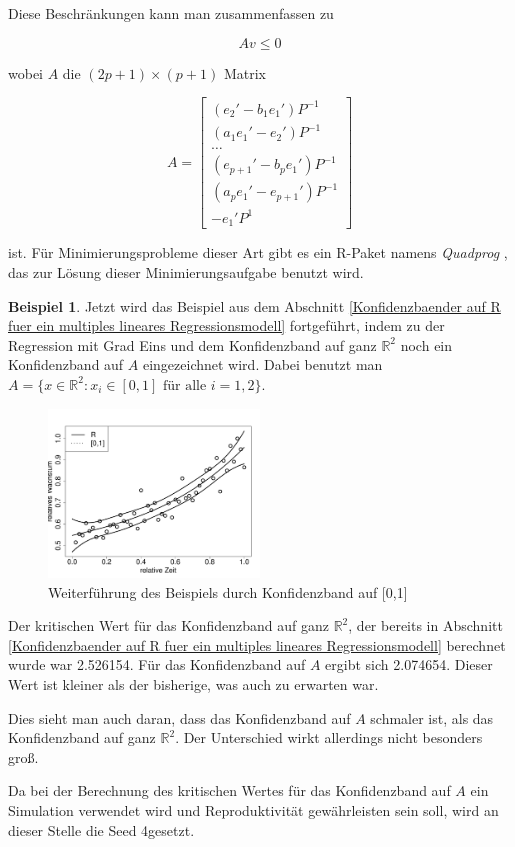 \documentclass[12pt,a4paper]{article}
\theoremstyle{definition}
\newtheorem{Beispiel}[Definition]{Beispiel}
\theoremstyle{definition}
\theoremstyle{definition}
\theoremstyle{definition}
\newcommand{\cR}{2.526154}
\newcommand{\seedsimulation}{4}
\newcommand{\cA}{2.074654}
\begin{document}
Diese Beschränkungen kann man zusammenfassen zu 

\begin{equation*}
A v \leq 0
\end{equation*}

wobei $A$ die $(2p+1) \times (p+1)$ Matrix

\[ 
A = 
\begin{bmatrix} (e_2'-b_1 e_1')P^{-1}  \\ 
				(a_1 e_1' - e_2')P^{-1}  \\  
				\ldots						 \\ 
				(e_{p+1}' - b_p e_1') P^{-1}	\\  
				(a_p e_1' - e_{p+1}')P^{-1}  \\
				-e_1'P^{1} 
\end{bmatrix}
\]

ist. Für Minimierungsprobleme dieser Art gibt es ein R-Paket namens \textit{Quadprog} , das zur Lösung dieser Minimierungsaufgabe benutzt wird.

\begin{Beispiel}
Jetzt wird das Beispiel aus dem Abschnitt \ref{Konfidenzbaender auf R fuer ein multiples lineares Regressionsmodell} fortgeführt, indem zu der Regression mit Grad Eins und dem Konfidenzband auf ganz $\mathbb{R}^{2}$ noch ein Konfidenzband auf $A$ eingezeichnet wird. Dabei benutzt man $A = \{x \in \mathbb{R}^2 : x_i \in [0,1] \text{ für alle } i=1, 2 \} $. 


\begin{figure}[H] 
  \centering
     \includegraphics[width=0.5\textwidth]{Bsp-KB-minmax}
  \caption{Weiterführung des Beispiels durch Konfidenzband auf [0,1]}
  \label{KB-minmax-BSP}
\end{figure}

Der kritischen Wert für das Konfidenzband auf ganz $\mathbb{R}^2$, der bereits in Abschnitt \ref{Konfidenzbaender auf R fuer ein multiples lineares Regressionsmodell} berechnet wurde war \cR . Für das Konfidenzband auf $A$ ergibt sich \cA . Dieser Wert ist kleiner als der bisherige, was auch zu erwarten war.

Dies sieht man auch daran, dass das Konfidenzband auf $A$ schmaler ist, als das Konfidenzband auf ganz $\mathbb{R}^2$. Der Unterschied wirkt allerdings nicht besonders groß.

Da bei der Berechnung des kritischen Wertes für das Konfidenzband auf $A$ ein Simulation verwendet wird und Reproduktivität gewährleisten sein soll, wird an dieser Stelle die Seed \seedsimulation gesetzt. 

\end{Beispiel}
\end{document}
